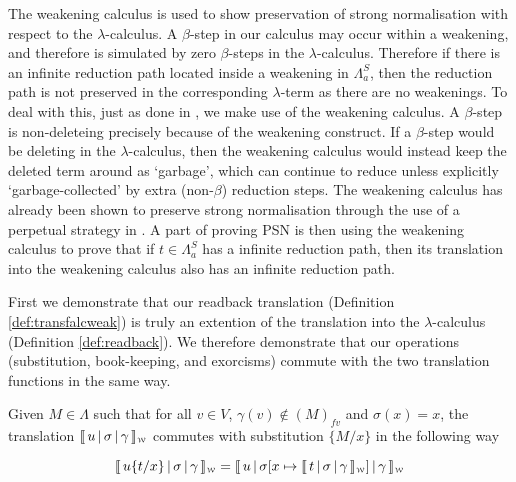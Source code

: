 \documentclass[a4paper,UKenglish,cleveref, autoref]{lipics-v2019}
\newcommand{\FALC}{\Lambda^{S}_{a}}
\newcommand{\fv}[1]{(#1)_{fv}}
\newcommand{\sub}[3]{#1 \{ #2 / #3 \}}
\newcommand{\weaksymbol}{\mbox{\tiny $\mathcal{W}$}}
\newcommand{\readweakwmap}[3]{\llbracket \, #1 \, \vert \, #2 \, \vert \, #3  \, \rrbracket_{\weaksymbol} }
\begin{document}
The weakening calculus is used to show preservation of strong normalisation with respect to the $\lambda$-calculus. A $\beta$-step in our calculus may occur within a weakening, and therefore is simulated by zero $\beta$-steps in the $\lambda$-calculus. Therefore if there is an infinite reduction path located inside a weakening in $\FALC$, then the reduction path is not preserved in the corresponding $\lambda$-term as there are no weakenings. To deal with this, just as done in \cite{kesneraccattoli12, gundersen2013atomic, he2018atomic}, we make use of the weakening calculus. A $\beta$-step is non-deleteing precisely because of the weakening construct. If a $\beta$-step would be deleting in the $\lambda$-calculus, then the weakening calculus would instead keep the deleted term around as `garbage', which can continue to reduce unless explicitly `garbage-collected' by extra (non-$\beta$) reduction steps. The weakening calculus has already been shown to preserve strong normalisation through the use of a perpetual strategy in \cite{gundersen2013atomic}. A part of proving PSN is then using the weakening calculus to prove that if $t \in \FALC$ has a infinite reduction path, then its translation into the weakening calculus also has an infinite reduction path. 

First we demonstrate that our readback translation (Definition \ref{def:transfalcweak}) is truly an extention of the translation into the $\lambda$-calculus (Definition \ref{def:readback}). We therefore demonstrate that our operations (substitution, book-keeping, and exorcisms) commute with the two translation functions in the same way.

\begin{proposition}
\label{prop:suboutcomm}
Given $M \in \Lambda$ such that for all $v \in V$, $\gamma(v) \not\in \fv{M}$  and $\sigma(x) = x$, the translation $\readweakwmap{u}{\sigma}{\gamma}$ commutes with substitution $\sub{}{M}{x}$ in the following way 

$$\readweakwmap{u \sub{}{t}{x}}{\sigma}{\gamma} = \readweakwmap{u}{\sigma[x \mapsto \readweakwmap{t}{\sigma}{\gamma}]}{\gamma}$$
\end{proposition}
\end{document}
